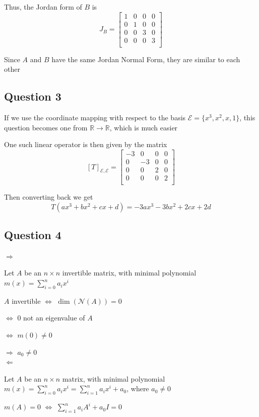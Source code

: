 \documentclass{article}
\begin{document}
Thus, the Jordan form of \(B\) is
\[
J_B = \begin{bmatrix}
    1 & 0 & 0 & 0 \\
    0 & 1 & 0 & 0 \\
    0 & 0 & 3 & 0 \\
    0 & 0 & 0 & 3 \\
\end{bmatrix}
\]

Since \(A\) and \(B\) have the same Jordan Normal Form, they are similar to each other

\subsection*{Question 3}
If we use the coordinate mapping with respect to the basis \(\mathcal{E} = \{x^3,x^2,x,1\}\), this question becomes one from
\(\mathbb{R} \rightarrow \mathbb{R}\), which is much easier

One such linear operator is then given by the matrix
\[
[T]_{\mathcal{E},\mathcal{E}} = \begin{bmatrix}
    -3 & 0 & 0 & 0 \\
    0 & -3 & 0 & 0 \\
    0 & 0 & 2 & 0 \\
    0 & 0 & 0 & 2 \\
\end{bmatrix}
\]

Then converting back we get
\[
T(ax^3 + bx^2 +cx + d) = -3ax^3 - 3bx^2 + 2cx + 2d
\]

\subsection*{Question 4}
\(\Rightarrow\)

Let \(A\) be an \(n\times n\) invertible matrix, with minimal polynomial \(m(x) = \sum_{i=0}^n a_i x^i\)

\(A\) invertible \(\iff\) \(\dim(\mathcal{N}(A)) = 0\)

\(\iff\) 0 not an eigenvalue of \(A\)

\(\iff\) \(m(0) \neq 0\)

\(\Rightarrow\) \(a_0 \neq 0\)
\\

\(\Leftarrow\)

Let \(A\) be an \(n\times n\) matrix, with minimal polynomial \(m(x) = \sum_{i=0}^n a_i x^i = 
\sum_{i=1}^{n} a_i x^i + a_0\), where \(a_0 \neq 0\)

\(m(A) = 0\) \(\iff\) \(\sum_{i=1}^{n} a_i A^i + a_0I = 0\)
\end{document}
